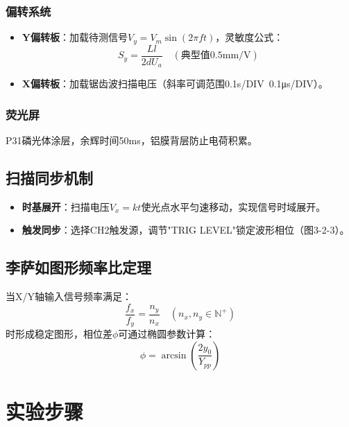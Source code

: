 \documentclass[12pt,a4paper]{article}
\begin{document}
\subsubsection{偏转系统}

\begin{itemize}
\item \textbf{Y偏转板}：加载待测信号$V_y=V_m\sin(2\pi ft)$，灵敏度公式：
\begin{equation}
S_y = \frac{Ll}{2dU_a} \quad (\text{典型值0.5mm/V})
\end{equation}
\item \textbf{X偏转板}：加载锯齿波扫描电压（斜率可调范围0.1s/DIV~0.1μs/DIV）。
\end{itemize}

\subsubsection{荧光屏}

P31磷光体涂层，余辉时间50ms，铝膜背层防止电荷积累。

\subsection{扫描同步机制}

\begin{itemize}
\item \textbf{时基展开}：扫描电压$V_x=kt$使光点水平匀速移动，实现信号时域展开。
\item \textbf{触发同步}：选择CH2触发源，调节"TRIG LEVEL"锁定波形相位（图3-2-3）。
\end{itemize}

\subsection{李萨如图形频率比定理}

当X/Y轴输入信号频率满足：
\begin{equation}
\frac{f_x}{f_y} = \frac{n_y}{n_x} \quad (n_x,n_y\in\mathbb{N}^+)
\end{equation}
时形成稳定图形，相位差$\phi$可通过椭圆参数计算：
\begin{equation}
\phi = \arcsin\left(\frac{2y_0}{Y_{pp}}\right)
\end{equation}

\section{实验步骤}
\end{document}
